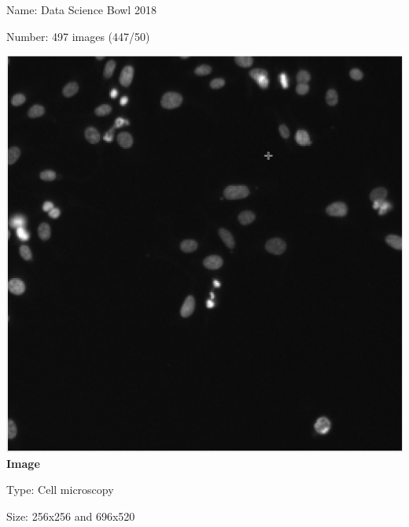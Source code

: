 \subsection{\slidetitle}
\begin{frame}
  \frametitle{\sectiontitle}
  \framesubtitle{\slidetitle}

  \begin{minipage}[h!]{0.40\textwidth}
    Name: Data Science Bowl 2018

    Number: 497 images (447/50)

    \centering
    \includegraphics[scale=0.13]{./img/3_benchmark/image_2.png}
    \textbf{Image}
  \end{minipage}\hfill
  \begin{minipage}[h!]{0.40\textwidth}
    Type: Cell microscopy

    Size: 256x256 and 696x520


\end{minipage}
\end{frame}
